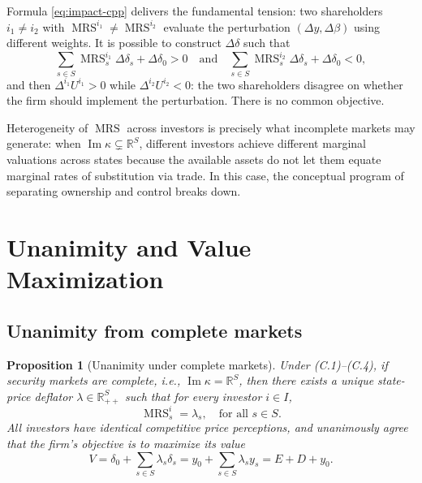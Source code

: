 \documentclass[11pt,a4paper,oneside]{book}
\def\R{\mathbb{R}}
\def\et{\quad \text{and} \quad}
\DeclareMathOperator{\MRS}{MRS}
\DeclareMathOperator{\Range}{Im}
\theoremstyle{plain}
\newtheorem{proposition}[theorem]{Proposition}
\theoremstyle{definition}
\theoremstyle{remark}
\numberwithin{equation}{chapter}
\begin{document}
Formula \eqref{eq:impact-cpp} delivers the fundamental tension: two shareholders $i_1 \neq i_2$ with $\MRS^{i_1} \neq \MRS^{i_2}$ evaluate the perturbation $(\Delta y, \Delta \beta)$ using different weights.
It is possible to construct $\Delta \delta$ such that
\begin{equation*}
  \sum_{s \in S} \MRS^{i_1}_s \Delta \delta_s + \Delta \delta_0 > 0
  \et
  \sum_{s \in S} \MRS^{i_2}_s \Delta \delta_s + \Delta \delta_0 < 0,
\end{equation*}
and then $\Delta^{i_1} U^{i_1} > 0$ while $\Delta^{i_2} U^{i_2} < 0$: the two shareholders disagree on whether the firm should implement the perturbation.
There is no common objective.

Heterogeneity of $\MRS$ across investors is precisely what incomplete markets may generate: when $\Range \kappa \subsetneq \R^S$, different investors achieve different marginal valuations across states because the available assets do not let them equate marginal rates of substitution via trade.
In this case, the conceptual program of separating ownership and control breaks down.

\section{Unanimity and Value Maximization}
\label{sec:unanimity}

\subsection{Unanimity from complete markets}

\begin{proposition}[Unanimity under complete markets]\label{prop:unanimity-complete}
Under \textup{(C.1)--(C.4)}, if security markets are complete, i.e., $\Range \kappa = \R^S$, then there exists a unique state-price deflator $\lambda \in \R^S_{++}$ such that for every investor $i \in I$,
\begin{equation*}
  \MRS^i_s = \lambda_s, \quad \text{for all $s\in S$}.
\end{equation*}
All investors have identical competitive price perceptions, and unanimously agree that the firm's objective is to maximize its value
\begin{equation}\label{eq:firm-value-complete}
  V = \delta_0 + \sum_{s \in S} \lambda_s \delta_s
    = y_0 + \sum_{s \in S} \lambda_s y_s
    = E + D + y_0.
\end{equation}
\end{proposition}
\end{document}
